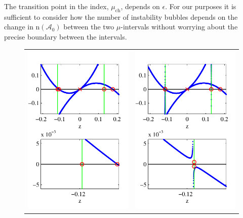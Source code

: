 \documentclass[review,onefignum,onetabnum]{siamart171218}
\newcommand{\rmn}{\mathrm{n}}
\newcommand{\calA}{\mathcal{A}}
\begin{document}
\begin{remark}
The transition point in the index, $\mu_{\mathrm{ch}}$, depends on $\epsilon$. For our purposes it is sufficient to consider how the number of instability bubbles depends on the change in $\rmn(\calA_0)$ between the two $\mu$-intervals without worrying about the precise boundary between the intervals.
\end{remark}


\begin{figure}[ht]%
\begin{center}
\begin{tabular}{cc}
\includegraphics{KreinEvalK000Mu36} &
\includegraphics{KreinEvalK005Mu36}

\end{tabular}
\end{center}
\end{figure}
\end{document}
